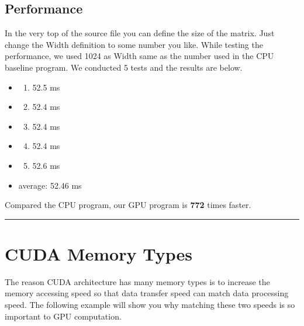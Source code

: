\documentclass[letterpaper,10pt,openany,oneside]{sphinxmanual}
\begin{document}
\subsection{Performance}
\label{CUDA2D/CUDA2D:id1}
In the very top of the source file you can define the size of the matrix. Just change the Width definition to some number you like. While testing the performance, we used 1024 as Width same as the number used in the CPU baseline program. We conducted 5 tests and the results are below.
\begin{itemize}
\item {} \begin{enumerate}
\item {} 
52.5 ms

\end{enumerate}

\item {} \begin{enumerate}
\setcounter{enumi}{1}
\item {} 
52.4 ms

\end{enumerate}

\item {} \begin{enumerate}
\setcounter{enumi}{2}
\item {} 
52.4 ms

\end{enumerate}

\item {} \begin{enumerate}
\setcounter{enumi}{3}
\item {} 
52.4 ms

\end{enumerate}

\item {} \begin{enumerate}
\setcounter{enumi}{4}
\item {} 
52.6 ms

\end{enumerate}

\item {} 
average: 52.46 ms

\end{itemize}

Compared the CPU program, our GPU program is \textbf{772} times faster.


\bigskip\hrule{}\bigskip



\section{CUDA Memory Types}
\label{CUDA2D/CUDA2D:cuda-memory-types}
The reason CUDA architecture has many memory types is to increase the memory accessing speed so that data transfer speed can match data processing speed. The following example will show you why matching these two speeds is so important to GPU computation.
\end{document}
